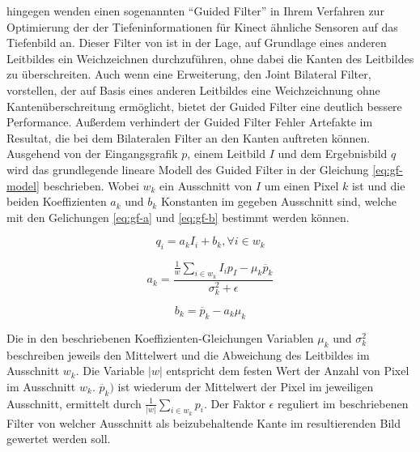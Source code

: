 \citet{liu2012guided} hingegen wenden einen sogenannten \enquote{Guided Filter} in Ihrem Verfahren zur Optimierung der der Tiefeninformationen für Kinect ähnliche Sensoren auf das Tiefenbild an. Dieser Filter von \citet{he2010guided} ist in der Lage, auf Grundlage eines anderen Leitbildes ein Weichzeichnen durchzuführen, ohne dabei die Kanten des Leitbildes zu überschreiten. Auch wenn \citet{petschnigg2004digital} eine Erweiterung, den Joint Bilateral Filter, vorstellen, der auf Basis eines anderen Leitbildes eine Weichzeichnung ohne Kantenüberschreitung ermöglicht, bietet der Guided Filter eine deutlich bessere Performance. Außerdem verhindert der Guided Filter Fehler Artefakte im Resultat, die bei dem Bilateralen Filter an den Kanten auftreten können. \citep{he2010guided} \\


Ausgehend von der Eingangsgrafik \(p\), einem Leitbild \(I\) und dem Ergebnisbild \(q\) wird das grundlegende lineare Modell des Guided Filter in der Gleichung \ref{eq:gf-model} beschrieben. Wobei \(w_k\) ein Ausschnitt von \(I\) um einen Pixel \(k\) ist und die beiden Koeffizienten \(a_k\) und \(b_k\) Konstanten im gegeben Ausschnitt sind, welche mit den Gelichungen \ref{eq:gf-a} und \ref{eq:gf-b} bestimmt werden können. \citep{he2010guided}


\begin{equation} \label{eq:gf-model}
q_{i} = a_{k} I_{i} + b_{k} , \forall i \in w_{k}
\end{equation}

\begin{equation} \label{eq:gf-a}
a_k = \frac{\frac{1}{w} \sum_{i \in w_k} I_i p_I - \mu_k \overline{p}_k}{\sigma_k^2+\epsilon}
\end{equation}

\begin{equation} \label{eq:gf-b}
b_k = \overline{p}_k - a_k\mu_k
\end{equation}

Die in den beschriebenen Koeffizienten-Gleichungen Variablen \(\mu_k\) und \(\sigma^2_k\) beschreiben jeweils den Mittelwert und die Abweichung des Leitbildes im Ausschnitt \(w_k\). Die Variable \(|w|\) entspricht dem festen Wert der Anzahl von Pixel im Ausschnitt \(w_k\). \(\overline{p}_k)\) ist wiederum der Mittelwert der Pixel im jeweiligen Ausschnitt, ermittelt durch \(\frac{1}{|w|}\sum_{i \in w_k} p_i\). Der Faktor \(\epsilon\) reguliert im beschriebenen Filter von \citet{he2010guided} welcher Ausschnitt als beizubehaltende Kante im resultierenden Bild gewertet werden soll. \citep{he2010guided}

